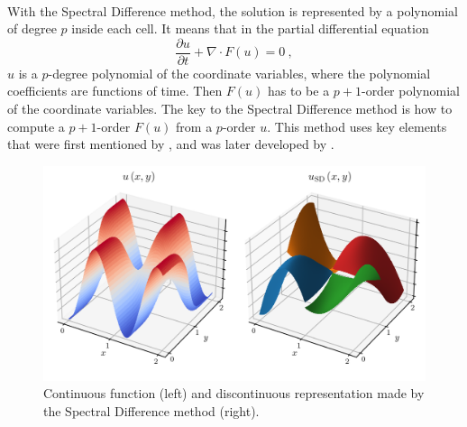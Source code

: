       \paragraph{}
      With the Spectral Difference method, the solution is represented by a polynomial of degree $p$ inside each cell.
      It means that in the partial differential equation
      \begin{equation}\label{eq:pde_2}
        \frac{\partial u}{\partial t} + \nabla \cdot F\left(u\right) = 0 \ ,
      \end{equation}
      $u$ is a $p$-degree polynomial of the coordinate variables, where the polynomial coefficients are functions of time.
      Then $F\left(u\right)$ has to be a $p\!+\!1$-order polynomial of the coordinate variables.
      The key to the Spectral Difference method is how to compute a $p + 1$-order $F\left(u\right)$ from a $p$-order $u$.
      This method uses key elements that were first mentioned by \cite{Kopriva1996}, and was later developed by \cite{LiuVinokurWang2006}.

      \begin{figure}
        \centering
        \includegraphics{figures/sd_discontinuous.png}
        \caption{Continuous function (left) and discontinuous representation made by the Spectral Difference method (right).}
        \label{fig:sd_discontinuous}
      \end{figure}

